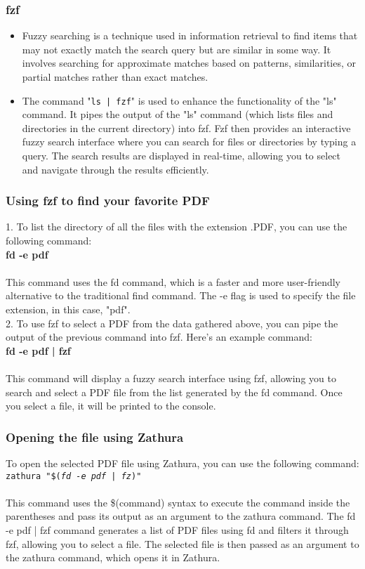 \documentclass[12pt]{article}
\begin{document}
\subsubsection{fzf}
\begin{itemize}
	\item Fuzzy searching is a technique used in information retrieval to find items that may not exactly match the search query but are similar in some way. It involves searching for approximate matches based on patterns, similarities, or partial matches rather than exact matches.
	\item The command "\texttt{ls | fzf}" is used to enhance the functionality of the "ls" command. It pipes the output of the "ls" command (which lists files and directories in the current directory) into fzf. Fzf then provides an interactive fuzzy search interface where you can search for files or directories by typing a query. The search results are displayed in real-time, allowing you to select and navigate through the results efficiently.
	
\end{itemize}

\subsubsection{Using fzf to find your favorite PDF}
1. To list the directory of all the files with the extension .PDF, you can use the following command:\\

\textbf{fd -e pdf}\\
\\This command uses the fd command, which is a faster and more user-friendly alternative to the traditional find command. The -e flag is used to specify the file extension, in this case, "pdf".\\
2. To use fzf to select a PDF from the data gathered above, you can pipe the output of the previous command into fzf. Here's an example command:\\


\textbf{fd -e pdf | fzf}\\
\\This command will display a fuzzy search interface using fzf, allowing you to search and select a PDF file from the list generated by the fd command. Once you select a file, it will be printed to the console.

\subsubsection{Opening the file using Zathura}
To open the selected PDF file using Zathura, you can use the following command:\\

\texttt{zathura "\$(\textit{fd -e pdf | fz})"}\\
\\This command uses the \$(command) syntax to execute the command inside the parentheses and pass its output as an argument to the zathura command. The fd -e pdf | fzf command generates a list of PDF files using fd and filters it through fzf, allowing you to select a file. The selected file is then passed as an argument to the zathura command, which opens it in Zathura.
\end{document}

